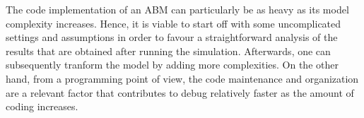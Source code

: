 The code implementation of an ABM can particularly be as heavy as its model complexity increases. Hence, it is viable to start off with some uncomplicated settings and assumptions in order to favour a straightforward analysis of the results that are obtained after running the simulation. Afterwards, one can subsequently tranform the model by adding more complexities. On the other hand, from a programming point of view, the code maintenance and organization are a relevant factor that contributes to debug relatively faster as the amount of coding increases.

